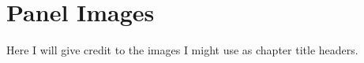 \chapter*{Panel Images}

Here I will give credit to the images I might use as chapter title headers.

